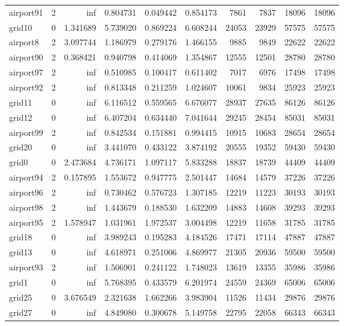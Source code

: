 \begin{longtable}{|l|r|r|r|r|r|r|r|r|r|}
airport91 & 2 & inf & 0.804731 & 0.049442 & 0.854173 & 7861 & 7837 & 18096 & 18096 \\
grid10 & 0 & 1.341689 & 5.739020 & 0.869224 & 6.608244 & 24053 & 23929 & 57575 & 57575 \\
airport8 & 2 & 3.097744 & 1.186979 & 0.279176 & 1.466155 & 9885 & 9849 & 22622 & 22622 \\
airport90 & 2 & 0.368421 & 0.940798 & 0.414069 & 1.354867 & 12555 & 12501 & 28780 & 28780 \\
airport97 & 2 & inf & 0.510985 & 0.100417 & 0.611402 & 7017 & 6976 & 17498 & 17498 \\
airport92 & 2 & inf & 0.813348 & 0.211259 & 1.024607 & 10061 & 9834 & 25923 & 25923 \\
grid11 & 0 & inf & 6.116512 & 0.559565 & 6.676077 & 28937 & 27635 & 86126 & 86126 \\
grid12 & 0 & inf & 6.407204 & 0.634440 & 7.041644 & 29245 & 28454 & 85031 & 85031 \\
airport99 & 2 & inf & 0.842534 & 0.151881 & 0.994415 & 10915 & 10683 & 28654 & 28654 \\
grid20 & 0 & inf & 3.441070 & 0.433122 & 3.874192 & 20555 & 19352 & 59430 & 59430 \\
grid0 & 0 & 2.473684 & 4.736171 & 1.097117 & 5.833288 & 18837 & 18739 & 44409 & 44409 \\
airport94 & 2 & 0.157895 & 1.553672 & 0.947775 & 2.501447 & 14684 & 14579 & 37226 & 37226 \\
airport96 & 2 & inf & 0.730462 & 0.576723 & 1.307185 & 12219 & 11223 & 30193 & 30193 \\
airport98 & 2 & inf & 1.443679 & 0.188530 & 1.632209 & 14883 & 14608 & 39293 & 39293 \\
airport95 & 2 & 1.578947 & 1.031961 & 1.972537 & 3.004498 & 12219 & 11658 & 31785 & 31785 \\
grid18 & 0 & inf & 3.989243 & 0.195283 & 4.184526 & 17471 & 17114 & 47887 & 47887 \\
grid13 & 0 & inf & 4.618971 & 0.251006 & 4.869977 & 21305 & 20936 & 59500 & 59500 \\
airport93 & 2 & inf & 1.506901 & 0.241122 & 1.748023 & 13619 & 13355 & 35986 & 35986 \\
grid1 & 0 & inf & 5.768395 & 0.433579 & 6.201974 & 24559 & 24369 & 65006 & 65006 \\
grid25 & 0 & 3.676549 & 2.321638 & 1.662266 & 3.983904 & 11526 & 11434 & 29876 & 29876 \\
grid27 & 0 & inf & 4.849080 & 0.300678 & 5.149758 & 22795 & 22058 & 66343 & 66343 \\

\end{longtable}
